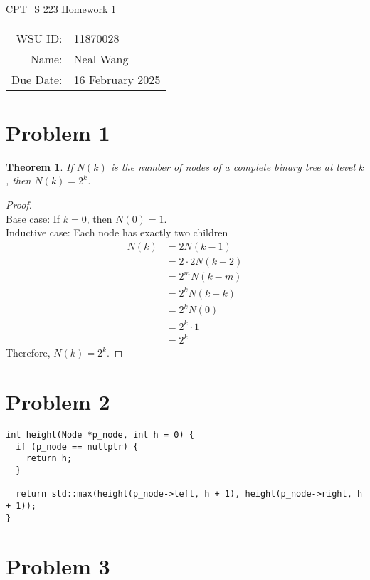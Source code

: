 \documentclass[12pt]{article}
\newtheorem{thm}{Theorem}
\begin{document}
\begin{center}
  {\Large CPT\_S 223 Homework 1}
  $ $\\
  $ $\\
  \begin{tabular}{rl}
    WSU ID: & 11870028 \\
    Name: & Neal Wang \\
    Due Date: & 16 February 2025
  \end{tabular}
\end{center}

\section*{Problem 1}

\begin{thm}
  If $N(k)$ is the number of nodes of a complete binary tree at level
  $k$, then $N(k) = 2^k$.
\end{thm}

\begin{proof}
  $ $\\
  Base case: If $k = 0$, then $N(0) = 1$. \\
  Inductive case: Each node has exactly two children
  \begin{align*}
    N(k) & = 2N(k - 1) \\
    & = 2 \cdot 2N(k - 2) \\
    & = 2^mN(k - m) \\
    & = 2^kN(k - k) \\
    & = 2^kN(0) \\
    & = 2^k \cdot 1 \\
    & = 2^k
  \end{align*}
  Therefore, $N(k) = 2^k$.
\end{proof}

\section*{Problem 2}

\begin{verbatim}
int height(Node *p_node, int h = 0) {
  if (p_node == nullptr) {
    return h;
  }

  return std::max(height(p_node->left, h + 1), height(p_node->right, h + 1));
}
\end{verbatim}

\section*{Problem 3}
\end{document}

